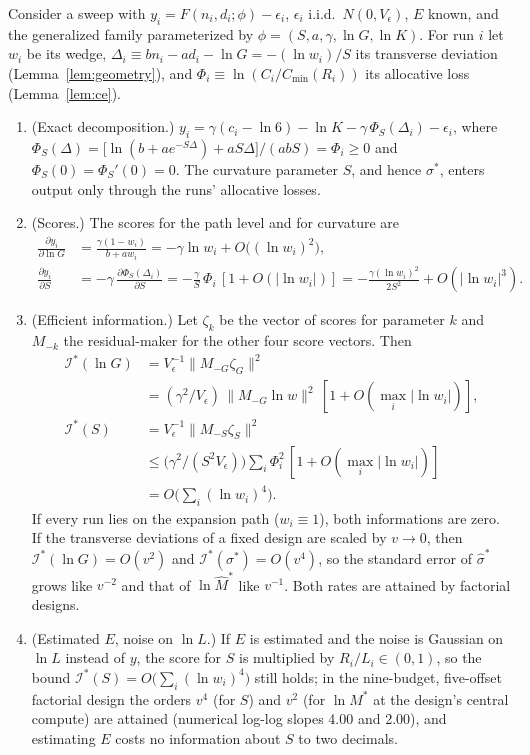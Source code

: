 \begin{proposition}\label{prop:A-info}
Consider a sweep with $y_i=F(n_i,d_i;\phi)-\epsilon_i$, $\epsilon_i$ i.i.d.\ $N(0,V_\epsilon)$, $E$ known, and the generalized
family parameterized by $\phi=(S,a,\gamma,\ln G,\ln K)$. For run $i$ let $w_i$ be its wedge,
$\Delta_i\equiv bn_i-ad_i-\ln G=-(\ln w_i)/S$ its transverse deviation (Lemma~\ref{lem:geometry}), and
$\Phi_i\equiv\ln(C_i/C_{\min}(R_i))$ its allocative loss (Lemma~\ref{lem:ce}).
\begin{enumerate}
\item[(i)] (Exact decomposition.) $y_i=\gamma(c_i-\ln6)-\ln K-\gamma\,\Phi_S(\Delta_i)-\epsilon_i$, where
$\Phi_S(\Delta)=\big[\ln(b+ae^{-S\Delta})+aS\Delta\big]/(abS)=\Phi_i\ge0$ and $\Phi_S(0)=\Phi_S'(0)=0$. The curvature
parameter $S$, and hence $\sigma^*$, enters output only through the runs' allocative losses.
\item[(ii)] (Scores.) The scores for the path level and for curvature are
\begin{align*}
\frac{\partial y_i}{\partial\ln G}&=\frac{\gamma(1-w_i)}{b+aw_i}=-\gamma\ln w_i+O\big((\ln w_i)^2\big),\\
\frac{\partial y_i}{\partial S}&=-\gamma\,\frac{\partial\Phi_S(\Delta_i)}{\partial S}=-\frac{\gamma}{S}\,\Phi_i\,[1+O(|\ln w_i|)]
=-\frac{\gamma(\ln w_i)^2}{2S^2}+O(|\ln w_i|^3).
\end{align*}
\item[(iii)] (Efficient information.) Let $\zeta_k$ be the vector of scores for parameter $k$ and $M_{-k}$ the
residual-maker for the other four score vectors. Then
\begin{align*}
\mathcal I^*(\ln G)&=V_\epsilon^{-1}\|M_{-G}\zeta_G\|^2\\
&=(\gamma^2/V_\epsilon)\,\|M_{-G}\ln w\|^2\,[1+O(\textstyle\max_i|\ln w_i|)],\\
\mathcal I^*(S)&=V_\epsilon^{-1}\|M_{-S}\zeta_S\|^2\\
&\le\big(\gamma^2/(S^2V_\epsilon)\big)\textstyle\sum_i\Phi_i^2\,[1+O(\max_i|\ln w_i|)]\\
&=O\big(\textstyle\sum_i(\ln w_i)^4\big).
\end{align*}
If every run lies on the expansion path ($w_i\equiv1$), both informations are zero. If the transverse deviations of a
fixed design are scaled by $v\to0$, then $\mathcal I^*(\ln G)=O(v^2)$ and $\mathcal I^*(\sigma^*)=O(v^4)$, so the
standard error of $\hat\sigma^*$ grows like $v^{-2}$ and that of $\ln\hat M^*$ like $v^{-1}$. Both rates are attained
by factorial designs.
\item[(iv)] (Estimated $E$, noise on $\ln L$.) If $E$ is estimated and the noise is Gaussian on $\ln L$ instead of $y$, the
score for $S$ is multiplied by $R_i/L_i\in(0,1)$, so the bound $\mathcal I^*(S)=O\big(\sum_i(\ln w_i)^4\big)$ still holds;
in the nine-budget, five-offset factorial design the orders $v^4$ (for $S$) and $v^2$ (for $\ln M^*$ at the design's
central compute) are attained (numerical log-log slopes 4.00 and 2.00), and estimating $E$ costs no information about
$S$ to two decimals.
\end{enumerate}
\end{proposition}

